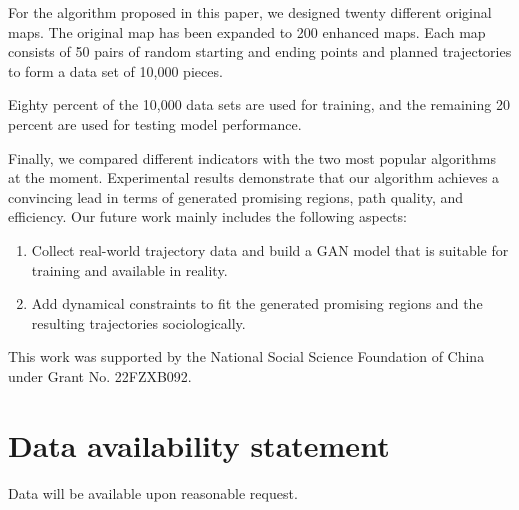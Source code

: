 \documentclass[smallcondensed]{svjour3}     %
\begin{document}
For the algorithm proposed in this paper, we designed twenty different original maps.
The original map has been expanded to 200 enhanced maps.
Each map consists of 50 pairs of random starting and ending points and planned trajectories to form a data set of 10,000 pieces.

Eighty percent of the 10,000 data sets are used for training, and the remaining 20 percent are used for testing model performance.

Finally, we compared different indicators with the two most popular algorithms at the moment.
Experimental results demonstrate that our algorithm achieves a convincing lead in terms of generated promising regions, path quality, and efficiency.
Our future work mainly includes the following aspects:
\begin{enumerate}
	\item Collect real-world trajectory data and build a GAN model that is suitable for training and available in reality.
	\item Add dynamical constraints to fit the generated promising regions and the resulting trajectories sociologically.
\end{enumerate}

\begin{acknowledgements}
This work was supported by the National Social Science Foundation of China under Grant No. 22FZXB092.

\end{acknowledgements}

\section*{Data availability statement}
Data will be available upon reasonable request.




\end{document}
